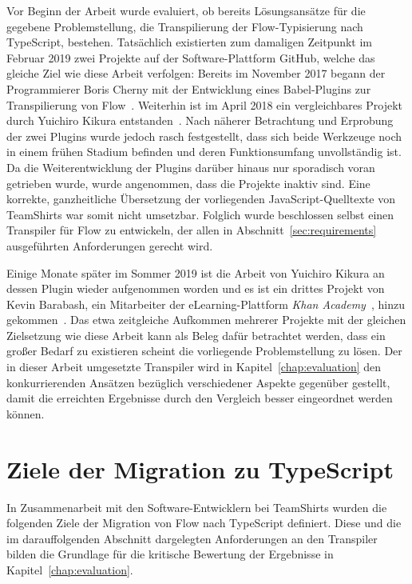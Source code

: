 Vor Beginn der Arbeit wurde evaluiert, ob bereits Lösungsansätze für die gegebene Problemstellung, die Transpilierung der Flow-Typisierung nach TypeScript, bestehen. Tatsächlich existierten zum damaligen Zeitpunkt im Februar 2019 zwei Projekte auf der Software-Plattform GitHub, welche das gleiche Ziel wie diese Arbeit verfolgen: Bereits im November 2017 begann der Programmierer Boris Cherny mit der Entwicklung eines Babel-Plugins zur Transpilierung von Flow~\autocite{CHERNY:FLOW_TO_TS}. Weiterhin ist im April 2018 ein vergleichbares Projekt durch Yuichiro Kikura entstanden~\autocite{KIKURA:FLOW_TO_TS}. Nach näherer Betrachtung und Erprobung der zwei Plugins wurde jedoch rasch festgestellt, dass sich beide Werkzeuge noch in einem frühen Stadium befinden und deren Funktionsumfang unvollständig ist. Da die Weiterentwicklung der Plugins darüber hinaus nur sporadisch voran getrieben wurde, wurde angenommen, dass die Projekte inaktiv sind. Eine korrekte, ganzheitliche Übersetzung der vorliegenden JavaScript-Quelltexte von TeamShirts war somit nicht umsetzbar. Folglich wurde beschlossen selbst einen Transpiler für Flow zu entwickeln, der allen in Abschnitt~\ref{sec:requirements} ausgeführten Anforderungen gerecht wird.

Einige Monate später im Sommer 2019 ist die Arbeit von Yuichiro Kikura an dessen Plugin wieder aufgenommen worden und es ist ein drittes Projekt von Kevin Barabash, ein Mitarbeiter der eLearning-Plattform \textit{Khan Academy}~\autocite{KHAN_ACADEMY}, hinzu gekommen~\autocite{BARABASH:FLOW_TO_TS}. Das etwa zeitgleiche Aufkommen mehrerer Projekte mit der gleichen Zielsetzung wie diese Arbeit kann als Beleg dafür betrachtet werden, dass ein großer Bedarf zu existieren scheint die vorliegende Problemstellung zu lösen.
Der in dieser Arbeit umgesetzte Transpiler wird in Kapitel~\ref{chap:evaluation} den konkurrierenden Ansätzen bezüglich verschiedener Aspekte gegenüber gestellt, damit die erreichten Ergebnisse durch den Vergleich besser eingeordnet werden können.

\section{Ziele der Migration zu TypeScript}
\label{sec:goals}

In Zusammenarbeit mit den Software-Entwicklern bei TeamShirts wurden die folgenden Ziele der Migration von Flow nach TypeScript definiert. Diese und die im darauffolgenden Abschnitt dargelegten Anforderungen an den Transpiler bilden die Grundlage für die kritische Bewertung der Ergebnisse in Kapitel~\ref{chap:evaluation}.

